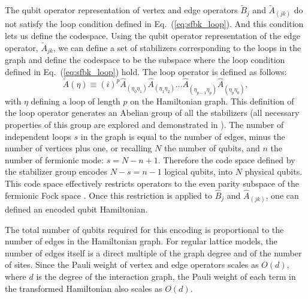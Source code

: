 The qubit operator representation of vertex and edge operators $\tilde{B}_{j}$ and $\tilde{A}_{(j k)}$ do not satisfy the loop condition defined in Eq.~(\ref{eq:sfbk_loop}). And this condition lets us define the codespace. Using the qubit operator representation of the edge operator, $\tilde{A}_{jk}$, we can define a set of stabilizers corresponding to the loops in the graph and define the codespace to be the subspace where the loop condition defined in Eq.~(\ref{eq:sfbk_loop}) hold. The loop operator is defined as follows:
\begin{equation} \label{eq:loop_operator}
    \tilde{A}(\eta) \equiv  (i)^{p} \hat{A}_{(\eta_0 \eta_1)}\hat{A}_{(\eta_1 \eta_2)} \dots \hat{A}_{(\eta_{p-1} \eta_p)}\hat{A}_{(\eta_p \eta_0)}, 
\end{equation}
with $\eta$ defining a loop of length $p$ on the Hamiltonian graph. 
This definition of the loop operator generates an Abelian group of all the stabilizers (all necessary properties of this group are explored and demonstrated in \cite{Setia2019}). The number of independent loops $s$ in the graph is equal to the number of edges, minus the number of vertices plus one, or recalling $N$ the number of qubits, and $n$ the number of fermionic mode: $s = N - n + 1$. Therefore the code space defined by the stabilizer group encodes $N - s = n - 1$ logical qubits, into $N$ physical qubits. This code space effectively restricts operators to the even parity subspace of the fermionic Fock space \cite{Bravyi2002, Setia2019}. Once this restriction is applied to $\hat{B}_{j}$ and $\hat{A}_{(j k)}$, one can defined an encoded qubit Hamiltonian.

The total number of qubits required for this encoding is proportional to the number of edges in the Hamiltonian graph. For regular lattice models, the number of edges itself is a direct multiple of the graph degree and of the number of sites. Since the Pauli weight of vertex and edge operators scales as $O(d)$, where $d$ is the degree of the interaction graph, the Pauli weight of each term in the transformed Hamiltonian also scales as $O(d)$.


